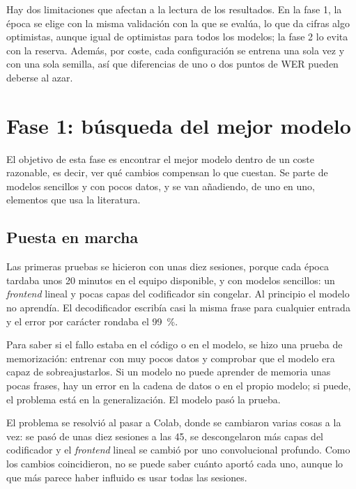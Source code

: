 Hay dos limitaciones que afectan a la lectura de los resultados. En la fase 1, la época se elige con la misma validación con la que se evalúa, lo que da cifras algo optimistas, aunque igual de optimistas para todos los modelos; la fase 2 lo evita con la reserva. Además, por coste, cada configuración se entrena una sola vez y con una sola semilla, así que diferencias de uno o dos puntos de WER pueden deberse al azar.

\section{Fase 1: búsqueda del mejor modelo}
\label{sec:fase1}

El objetivo de esta fase es encontrar el mejor modelo dentro de un coste razonable, es decir, ver qué cambios compensan lo que cuestan. Se parte de modelos sencillos y con pocos datos, y se van añadiendo, de uno en uno, elementos que usa la literatura.

\subsection{Puesta en marcha}

Las primeras pruebas se hicieron con unas diez sesiones, porque cada época tardaba unos 20 minutos en el equipo disponible, y con modelos sencillos: un \textit{frontend} lineal y pocas capas del codificador sin congelar. Al principio el modelo no aprendía. El decodificador escribía casi la misma frase para cualquier entrada y el error por carácter rondaba el \SI{99}{\percent}.

Para saber si el fallo estaba en el código o en el modelo, se hizo una prueba de memorización: entrenar con muy pocos datos y comprobar que el modelo era capaz de sobreajustarlos. Si un modelo no puede aprender de memoria unas pocas frases, hay un error en la cadena de datos o en el propio modelo; si puede, el problema está en la generalización. El modelo pasó la prueba.

El problema se resolvió al pasar a Colab, donde se cambiaron varias cosas a la vez: se pasó de unas diez sesiones a las 45, se descongelaron más capas del codificador y el \textit{frontend} lineal se cambió por uno convolucional profundo. Como los cambios coincidieron, no se puede saber cuánto aportó cada uno, aunque lo que más parece haber influido es usar todas las sesiones.

